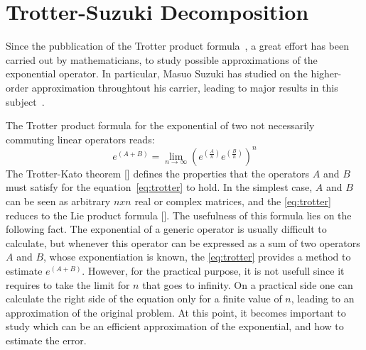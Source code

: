 \chapter{Trotter-Suzuki Decomposition}

Since the pubblication of the Trotter product formula~\cite{Trotter1959}, a great effort has been carried out by mathematicians, to study possible approximations of the exponential operator. In particular, Masuo Suzuki has studied on the higher-order approximation throughtout his carrier, leading to major results in this subject~\cite{Suzuki1985, Suzuki2000}.

The Trotter product formula for the exponential of two not necessarily commuting linear operators reads:
\begin{equation} \label{eq:trotter}
e^{(A+B)} = \lim_{n\rightarrow\infty} (e^{(\frac{A}{n})} e^{(\frac{B}{n})})^n
\end{equation}
The Trotter-Kato theorem [] defines the properties that the operators $A$ and $B$ must satisfy for the equation~\eqref{eq:trotter} to hold. In the simplest case, $A$ and $B$ can be seen as arbitrary $nxn$ real or complex matrices, and the \eqref{eq:trotter} reduces to the Lie product formula []. The usefulness of this formula lies on the following fact. The exponential of a generic operator is usually difficult to calculate, but whenever this operator can be expressed as a sum of two operators $A$ and $B$, whose exponentiation is known, the \eqref{eq:trotter} provides a method to estimate $e^{(A+B)}$. However, for the practical purpose, it is not usefull since it requires to take the limit for $n$ that goes to infinity. On a practical side one can calculate the right side of the equation only for a finite value of $n$, leading to an approximation of the original problem. At this point, it becomes important to study which can be an efficient approximation of the exponential, and how to estimate the error.

